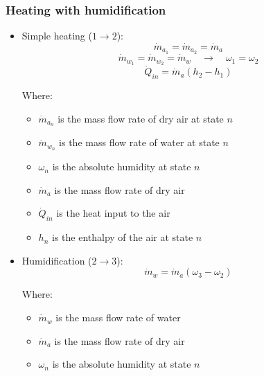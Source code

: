 \documentclass[11pt]{article}
\begin{document}
\subsubsection{Heating with humidification}
\label{sec:org034f4b0}
\begin{itemize}
\item Simple heating (\(1 \rightarrow 2\)):
\[\dot{m}_{a_1} = \dot{m}_{a_2} = \dot{m}_a\]
\[\dot{m}_{w_1} = \dot{m}_{w_2} = \dot{m}_w \quad \rightarrow \quad \omega_1 = \omega_2\]
\[\dot{Q}_{in} = \dot{m}_a (h_2 - h_1)\]

Where:
\begin{itemize}
\item \(\dot{m}_{a_n}\) is the mass flow rate of dry air at state \(n\)
\item \(\dot{m}_{w_n}\) is the mass flow rate of water at state \(n\)
\item \(\omega_n\) is the absolute humidity at state \(n\)
\item \(\dot{m}_{a}\) is the mass flow rate of dry air
\item \(\dot{Q}_{in}\) is the heat input to the air
\item \(h_n\) is the enthalpy of the air at state \(n\)
\end{itemize}

\item Humidification (\(2 \rightarrow 3\)):
\[\dot{m}_w = \dot{m}_a (\omega_3 - \omega_2)\]

Where:
\begin{itemize}
\item \(\dot{m}_w\) is the mass flow rate of water
\item \(\dot{m}_{a}\) is the mass flow rate of dry air
\item \(\omega_n\) is the absolute humidity at state \(n\)
\end{itemize}
\end{itemize}

 \newpage
\end{document}
